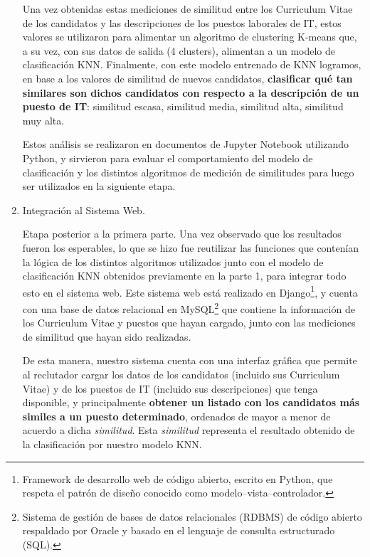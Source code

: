 \documentclass[12pt,a4paper]{article}
\begin{document}
\begin{sloppypar}
\begin{enumerate}
Una vez obtenidas estas mediciones de similitud entre los Curriculum Vitae de los candidatos y las descripciones de los puestos laborales de IT, estos valores se utilizaron para alimentar un algoritmo de clustering K-means que, a su vez, con sus datos de salida (4 clusters), alimentan a un modelo de clasificación KNN. Finalmente, con este modelo entrenado de KNN logramos, en base a los valores de similitud de nuevos candidatos, \textbf{clasificar qué tan similares son dichos candidatos con respecto a la descripción de un puesto de IT}: similitud escasa, similitud media, similitud alta, similitud muy alta.

Estos análisis se realizaron en documentos de Jupyter Notebook utilizando Python, y sirvieron para evaluar el comportamiento del modelo de clasificación y los distintos algoritmos de medición de similitudes para luego ser utilizados en la siguiente etapa. \\

\item Integración al Sistema Web. 

Etapa posterior a la primera parte. Una vez observado que los resultados fueron los esperables, lo que se hizo fue reutilizar las funciones que contenían la lógica de los distintos algoritmos utilizados junto con el modelo de clasificación KNN obtenidos previamente en la parte 1, para integrar todo esto en el sistema web. Este sistema web está realizado en Django\footnote{Framework de desarrollo web de código abierto, escrito en Python, que respeta el patrón de diseño conocido como modelo–vista–controlador.}, y cuenta con una base de datos relacional en MySQL\footnote{Sistema de gestión de bases de datos relacionales (RDBMS) de código abierto respaldado por Oracle y basado en el lenguaje de consulta estructurado (SQL).} que contiene la información de los Curriculum Vitae y puestos que hayan cargado, junto con las mediciones de similitud que hayan sido realizadas. 

De esta manera, nuestro sistema cuenta con una interfaz gráfica que permite al reclutador cargar los datos de los candidatos (incluido sus Curriculum Vitae) y de los puestos de IT (incluido sus descripciones) que tenga disponible, y principalmente \textbf{obtener un listado con los candidatos más similes a un puesto determinado}, ordenados de mayor a menor de acuerdo a dicha \textit{similitud}. Esta \textit{similitud} representa el resultado obtenido de la clasificación por nuestro modelo KNN.

\end{enumerate}


\end{sloppypar}
\end{document}
